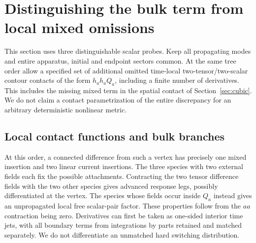 \section{Distinguishing the bulk term from local mixed omissions}\label{sec:null}

This section uses three distinguishable scalar probes. Keep all propagating modes and entire apparatus, initial and endpoint sectors common. At the same tree order allow a specified set of additional omitted time-local two-tensor/two-scalar contour contacts of the form \(h_a h_a Q_a\), including a finite number of derivatives. This includes the missing mixed term in the spatial contact of Section~\ref{sec:cubic}. We do not claim a contact parametrization of the entire discrepancy for an arbitrary deterministic nonlinear metric.

\subsection{Local contact functions and bulk branches}
At this order, a connected difference from such a vertex has precisely one mixed insertion and two linear current insertions. The three species with two external fields each fix the possible attachments. Contracting the two tensor difference fields with the two other species gives advanced response legs, possibly differentiated at the vertex. The species whose fields occur inside \(Q_a\) instead gives an unpropagated local free scalar-pair factor. These properties follow from the \(aa\) contraction being zero. Derivatives can first be taken as one-sided interior time jets, with all boundary terms from integrations by parts retained and matched separately. We do not differentiate an unmatched hard switching distribution.

